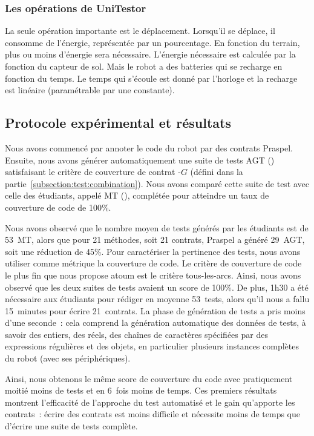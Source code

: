 \subsubsection{Les opérations de UniTestor}

La seule opération importante est le déplacement. Lorsqu'il se déplace, il
consomme de l'énergie, représentée par un pourcentage. En fonction du terrain,
plus ou moins d'énergie sera nécessaire. L'énergie nécessaire est calculée par
la fonction  du capteur de sol. Mais le robot a des
batteries qui se recharge en fonction du temps. Le temps qui s'écoule est donné
par l'horloge et la recharge est linéaire (paramétrable par une constante).

\subsection{Protocole expérimental et résultats}

Nous avons commencé par annoter le code du robot par des contrats Praspel.
Ensuite, nous avons générer automatiquement une suite de tests AGT
() satisfaisant le critère de
couverture de contrat -$G$ (défini dans la
partie~\ref{subsection:test:combination}). Nous avons comparé cette suite de
test avec celle des étudiants, appelé MT (), complétée
pour atteindre un taux de couverture de code de 100\%.

Nous avons observé que le nombre moyen de tests générés par les étudiants est de
53~MT, alors que pour 21 méthodes, soit 21 contrats, Praspel a généré 29~AGT,
soit une réduction de 45\%. Pour caractériser la pertinence des tests, nous
avons utiliser comme métrique la couverture de code. Le critère de couverture de
code le plus fin que nous propose atoum est le critère tous-les-arcs. Ainsi,
nous avons observé que les deux suites de tests avaient un score de 100\%. De
plus, 1h30 a été nécessaire aux étudiants pour rédiger en moyenne 53~tests,
alors qu'il nous a fallu 15~minutes pour écrire 21~contrats.  La phase de
génération de tests a pris moins d'une seconde~: cela comprend la génération
automatique des données de tests, à savoir des entiers, des réels, des chaînes
de caractères spécifiées par des expressions régulières et des objets, en
particulier plusieurs instances complètes du robot (avec ses périphériques).

Ainsi, nous obtenons le même score de couverture du code avec pratiquement
moitié moins de tests et en 6~fois moins de temps. Ces premiers résultats
montrent l'efficacité de l'approche du test automatisé et le gain qu'apporte les
contrats~: écrire des contrats est moins difficile et nécessite moins de temps
que d'écrire une suite de tests complète.

